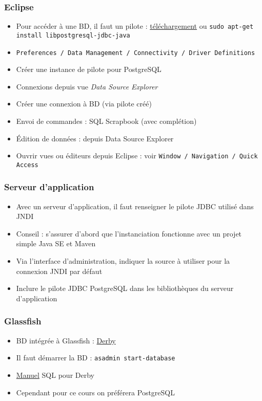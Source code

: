 \documentclass[english, french]{beamer}
\begin{document}
\begin{frame}
	\frametitle{Eclipse}
	\begin{itemize}
		\item Pour accéder à une BD, il faut un pilote : \href{https://jdbc.postgresql.org/}{téléchargement} {\tiny ou \texttt{sudo apt-get install libpostgresql-jdbc-java}}
		\item \texttt{Preferences / Data Management / Connectivity / Driver Definitions}
		\item Créer une instance de pilote pour PostgreSQL
		\item Connexions depuis vue \emph{Data Source Explorer}
		\item Créer une connexion à BD (via pilote créé)
		\item Envoi de commandes : SQL Scrapbook (avec complétion)
		\item Édition de données : depuis Data Source Explorer
		\item Ouvrir vues ou éditeurs depuis Eclipse : voir \texttt{Window / Navigation / Quick Access}
	\end{itemize}
\end{frame}

\begin{frame}
	\frametitle{Serveur d’application}
	\begin{itemize}
		\item Avec un serveur d’application, il faut renseigner le pilote JDBC utilisé dans JNDI
		\item Conseil : s’assurer d’abord que l’instanciation fonctionne avec un projet simple Java SE et Maven
		\item Via l’interface d’administration, indiquer la source à utiliser pour la connexion JNDI par défaut
		\item Inclure le pilote JDBC PostgreSQL dans les bibliothèques du serveur d’application
	\end{itemize}
\end{frame}

\begin{frame}
	\frametitle{Glassfish}
	\begin{itemize}
		\item BD intégrée à Glassfish : \href{https://db.apache.org/derby/}{Derby}
		\item Il faut démarrer la BD : \texttt{asadmin start-database}
		\item \href{https://db.apache.org/derby/docs/10.10/ref/index.html}{Manuel} SQL pour Derby
		\item Cependant pour ce cours on préférera PostgreSQL
	\end{itemize}
\end{frame}
\end{document}
